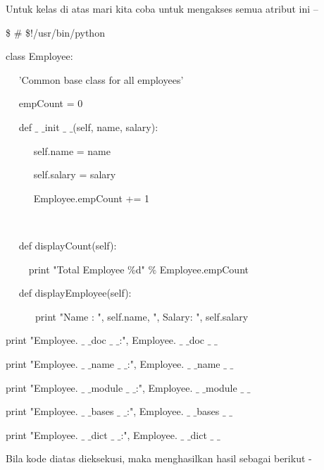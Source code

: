 \noindent 
Untuk kelas di atas mari kita coba untuk mengakses semua atribut ini – \par
\vspace{12pt}
\noindent 
 \$  \#  \$!/usr/bin/python \par
\vspace{12pt}
\noindent 
class Employee: \par
\noindent 
~~ 'Common base class for all employees' \par
\noindent 
~~ empCount = 0 \par
\vspace{12pt}
\noindent 
~~ def  $  \_  $ $  \_  $init $  \_  $ $  \_  $(self, name, salary): \par
\noindent 
~~~~~ self.name = name \par
\noindent 
~~~~~ self.salary = salary \par
\noindent 
~~~~~ Employee.empCount += 1 \par
\noindent 
~~  \par
\noindent 
~~ def displayCount(self): \par
\noindent 
~~~~ print "Total Employee  $  \%  $d"  $  \%  $ Employee.empCount \par
\vspace{12pt}
\noindent 
~~ def displayEmployee(self): \par
\noindent 
~~~~~~print "Name : ", self.name,  ", Salary: ", self.salary \par
\vspace{12pt}
\noindent 
print "Employee. $  \_  $ $  \_  $doc $  \_  $ $  \_  $:", Employee. $  \_  $ $  \_  $doc $  \_  $ $  \_  $ \par
\noindent 
print "Employee. $  \_  $ $  \_  $name $  \_  $ $  \_  $:", Employee. $  \_  $ $  \_  $name $  \_  $ $  \_  $ \par
\noindent 
print "Employee. $  \_  $ $  \_  $module $  \_  $ $  \_  $:", Employee. $  \_  $ $  \_  $module $  \_  $ $  \_  $ \par
\noindent 
print "Employee. $  \_  $ $  \_  $bases $  \_  $ $  \_  $:", Employee. $  \_  $ $  \_  $bases $  \_  $ $  \_  $ \par
\noindent 
print "Employee. $  \_  $ $  \_  $dict $  \_  $ $  \_  $:", Employee. $  \_  $ $  \_  $dict $  \_  $ $  \_  $ \par
\vspace{12pt}
\vspace{12pt}
\noindent 
Bila kode diatas dieksekusi, maka menghasilkan hasil sebagai berikut - \par
